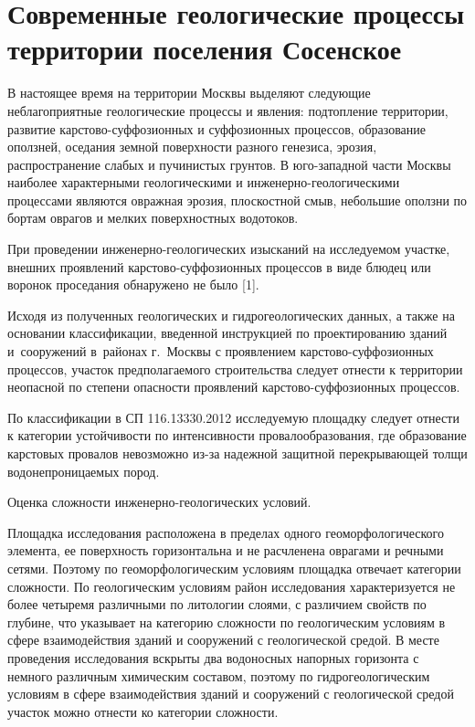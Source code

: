\chapter{Современные геологические процессы территории поселения Сосенское}\label{ch:ch5}

В настоящее время на территории Москвы выделяют следующие неблагоприятные геологические процессы и явления: 
подтопление территории, развитие карстово-суффозионных и суффозионных процессов, образование оползней, 
оседания земной поверхности разного генезиса, эрозия, распространение слабых и пучинистых грунтов. 
В юго-западной части Москвы наиболее характерными геологическими и инженерно-геологическими процессами 
являются овражная эрозия, плоскостной смыв, небольшие оползни по бортам оврагов и мелких поверхностных водотоков.

При проведении инженерно-геологических изысканий на исследуемом участке, внешних проявлений карстово-суффозионных 
процессов в виде блюдец или воронок проседания обнаружено не было [1].

Исходя из полученных геологических и гидрогеологических данных, а также на основании классификации, 
введенной инструкцией по проектированию зданий и~сооружений в~районах г.~Москвы с проявлением 
карстово-суффозионных процессов, участок предполагаемого строительства следует отнести к территории 
неопасной по степени опасности проявлений карстово-суффозионных процессов.

По классификации в СП 116.13330.2012 исследуемую площадку следует отнести к  категории устойчивости 
по интенсивности провалообразования, где образование карстовых провалов невозможно 
из-за надежной защитной перекрывающей толщи водонепроницаемых пород.

Оценка сложности инженерно-геологических условий. 

Площадка исследования расположена в пределах одного геоморфологического элемента, ее поверхность 
горизонтальна и не расчленена оврагами и речными сетями. 
Поэтому по геоморфологическим условиям площадка отвечает  категории сложности. 
По геологическим условиям район исследования характеризуется не более четыремя различными по литологии слоями, 
с различием свойств по глубине, что указывает на  
категорию сложности по геологическим условиям в сфере взаимодействия 
зданий и сооружений с геологической средой. 
В месте проведения исследования вскрыты два водоносных напорных горизонта с немного 
различным химическим составом, поэтому по гидрогеологическим 
условиям  в сфере взаимодействия зданий и сооружений с геологической 
средой участок можно отнести ко  категории сложности. 

